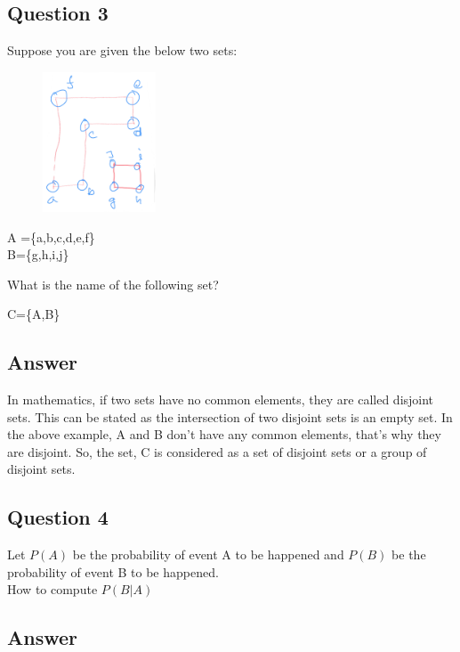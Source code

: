 \documentclass[12]{article}
\begin{document}
\subsection*{Question 3}
Suppose you are given the below two sets:

\begin{figure}
\centering
\includegraphics[width=0.3\textwidth]{set.png}
\end{figure}

\begin{center}
    A =\{a,b,c,d,e,f\}\\
    B=\{g,h,i,j\}
\end{center}

What is the name of the following set?
\begin{center}
C=\{A,B\}
\end{center}


\subsection*{Answer}

In mathematics, if two sets have no common elements, they are called disjoint sets. This can be stated as the intersection of two disjoint sets is an empty set. In the above example, A and B don't have any common elements, that's why they are disjoint. So, the set, C is considered as a set of disjoint sets or a group of disjoint sets.


\subsection*{Question 4}
Let $P(A)$ be the probability of event A to be happened and $P(B)$ be the probability of event B to be happened. \\ How to compute $P(B|A)$

\subsection*{Answer}
\end{document}
